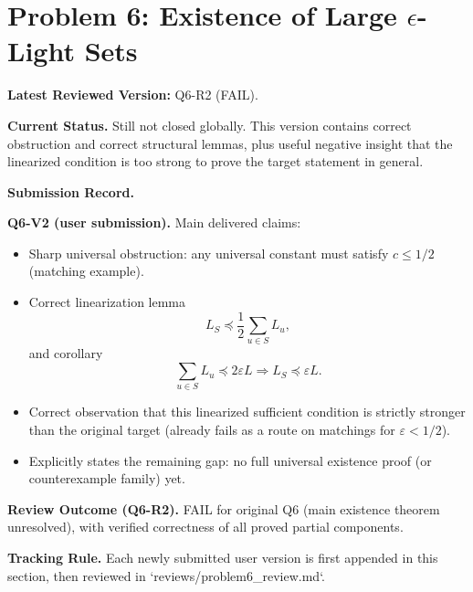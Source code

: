 \section{Problem 6: Existence of Large $\epsilon$-Light Sets}

\textbf{Latest Reviewed Version:} Q6-R2 (FAIL).

\textbf{Current Status.}
Still not closed globally. This version contains correct obstruction and correct structural lemmas, plus useful negative insight that the linearized condition is too strong to prove the target statement in general.

\textbf{Submission Record.}

\textbf{Q6-V2 (user submission).}
Main delivered claims:
\begin{itemize}
\item Sharp universal obstruction: any universal constant must satisfy $c\le 1/2$ (matching example).
\item Correct linearization lemma
\[
L_S\preceq \frac12\sum_{u\in S}L_u,
\]
and corollary
\[
\sum_{u\in S}L_u\preceq 2\varepsilon L \Rightarrow L_S\preceq \varepsilon L.
\]
\item Correct observation that this linearized sufficient condition is strictly stronger than the original target (already fails as a route on matchings for $\varepsilon<1/2$).
\item Explicitly states the remaining gap: no full universal existence proof (or counterexample family) yet.
\end{itemize}

\textbf{Review Outcome (Q6-R2).}
FAIL for original Q6 (main existence theorem unresolved), with verified correctness of all proved partial components.

\textbf{Tracking Rule.}
Each newly submitted user version is first appended in this section, then reviewed in `reviews/problem6_review.md`.
